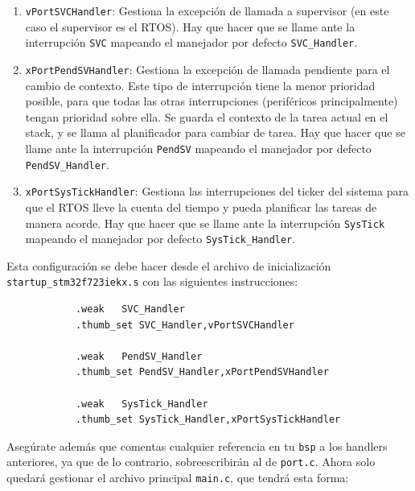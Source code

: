 \documentclass[../main.tex]{subfiles}
\begin{document}
        \begin{enumerate}
            \item \texttt{vPortSVCHandler}: Gestiona la excepción de llamada a supervisor (en este caso el supervisor es el RTOS). Hay que hacer que se llame ante la interrupción \texttt{SVC} mapeando el manejador por defecto \texttt{SVC\_Handler}.
            \item \texttt{xPortPendSVHandler}: Gestiona la excepción de llamada pendiente para el cambio de contexto. Este tipo de interrupción tiene la menor prioridad posible, para que todas las otras interrupciones (periféricos principalmente) tengan prioridad sobre ella. Se guarda el contexto de la tarea actual en el stack, y se llama al planificador para cambiar de tarea. Hay que hacer que se llame ante la interrupción \texttt{PendSV} mapeando el manejador por defecto \texttt{PendSV\_Handler}.
            \item \texttt{xPortSysTickHandler}: Gestiona las interrupciones del ticker del sistema para que el RTOS lleve la cuenta del tiempo y pueda planificar las tareas de manera acorde. Hay que hacer que se llame ante la interrupción \texttt{SysTick} mapeando el manejador por defecto \texttt{SysTick\_Handler}.
        \end{enumerate}

        Esta configuración se debe hacer desde el archivo de inicialización \texttt{startup\_stm32f723iekx.s} con las siguientes instrucciones:

        \begin{lstlisting}
            .weak	SVC_Handler
            .thumb_set SVC_Handler,vPortSVCHandler

            .weak	PendSV_Handler
            .thumb_set PendSV_Handler,xPortPendSVHandler

            .weak	SysTick_Handler
            .thumb_set SysTick_Handler,xPortSysTickHandler
        \end{lstlisting}

        Asegúrate además que comentas cualquier referencia en tu \texttt{bsp} a los handlers anteriores, ya que de lo contrario, sobreescribirán al de \texttt{port.c}. Ahora solo quedará gestionar el archivo principal \texttt{main.c}, que tendrá esta forma:
\end{document}
